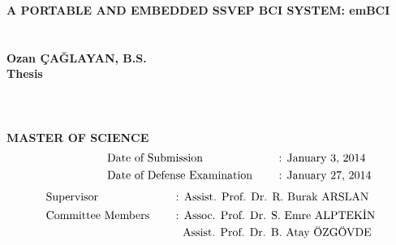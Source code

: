 \clearpage
\setcounter{page}{1}
\thispagestyle{empty}
{
\vspace*{-7.5mm}
\centering\textbf{A PORTABLE AND EMBEDDED SSVEP BCI SYSTEM: emBCI}\\\vspace*{1.5mm}
\\\vspace*{1.5mm}
\vspace*{19mm}
\\\vspace*{1.5mm}
\centering\textbf{Ozan ÇAĞLAYAN, B.S.}\\
\vspace*{30pt}
\centering\textbf{Thesis}\\\vspace*{1.5mm}
\\\vspace*{1.5mm}
\\\vspace*{1.5mm}
\\
\vspace*{30pt}
\centering\textbf{MASTER OF SCIENCE}\\
\vspace*{10pt}
\begin{alignat*}{2}
 & \quad\quad\quad\quad\quad\text{Date of Submission \quad } && \text{: January 3, 2014} \\
 & \quad\quad\quad\quad\quad\text{Date of Defense Examination \quad } && \text{: January 27, 2014}
\end{alignat*}
\vspace*{10pt}
\begin{alignat*}{2}
 & \text{Supervisor} && \text{: Assist. Prof. Dr. R. Burak ARSLAN} \\
 & \text{Committee Members \quad } && \text{: Assoc. Prof. Dr. S. Emre ALPTEKİN} \\
 & \text{} && \text{\; Assist. Prof. Dr. B. Atay ÖZGÖVDE}
\end{alignat*}
}